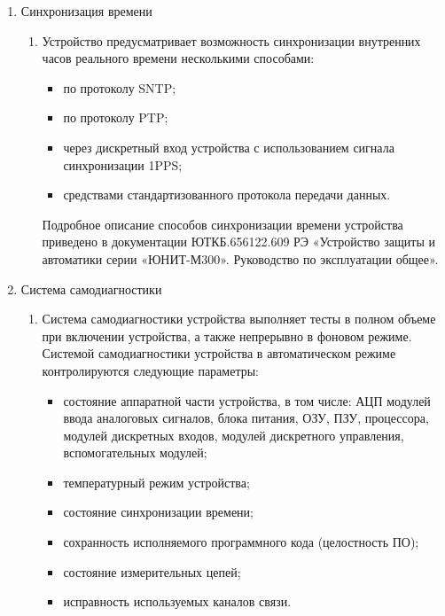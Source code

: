 \begin{enumerate}[label=\arabic{section}.\arabic{subsection}.\arabic*, labelsep=4pt, leftmargin=0pt, itemindent=57pt]
\begin{enumerate}[label=\arabic{section}.\arabic{subsection}.\arabic{enumi}.\arabic*, labelsep=4pt, leftmargin=0em, itemindent=65pt, parsep=0pt]
\end{enumerate}

\item Синхронизация времени
\begin{enumerate}[label=\arabic{section}.\arabic{subsection}.\arabic{enumi}.\arabic*, labelsep=4pt, leftmargin=0em, itemindent=65pt, parsep=0pt]

\item
Устройство предусматривает возможность синхронизации внутренних часов реального времени несколькими способами:
\begin{itemize}
\item по протоколу SNTP;
\item по протоколу PTP;
\item через дискретный вход устройства с использованием сигнала синхронизации 1PPS;
\item {средствами стандартизованного протокола передачи данных.}
\end{itemize}
Подробное описание способов синхронизации времени устройства приведено в документации ЮТКБ.656122.609 РЭ «Устройство защиты и автоматики серии «ЮНИТ-М300». Руководство по эксплуатации общее».

\end{enumerate}

\item Система самодиагностики
\begin{enumerate}[label=\arabic{section}.\arabic{subsection}.\arabic{enumi}.\arabic*, labelsep=4pt, leftmargin=0em, itemindent=65pt, parsep=0pt]

\item
Система самодиагностики устройства выполняет тесты в полном объеме при включении устройства, а также непрерывно в фоновом режиме.
Системой самодиагностики устройства в автоматическом режиме контролируются следующие параметры:
\begin{itemize}
\item состояние аппаратной части устройства, в том числе: АЦП модулей ввода аналоговых сигналов, блока питания, ОЗУ, ПЗУ, процессора, модулей дискретных входов, модулей дискретного управления, вспомогательных модулей;
\item температурный режим устройства;
\item состояние синхронизации времени;
\item сохранность исполняемого программного кода (целостность ПО);
\item состояние измерительных цепей;
\item исправность используемых каналов связи.
\end{itemize}


\end{enumerate}
\end{enumerate}
